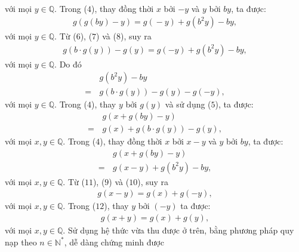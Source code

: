 \begin{multicols}{2}
\begin{align*}
	\end{align*}
	với mọi $y \in \mathbb{Q}$.
	\vskip 0.05cm
	Trong ($4$), thay đồng thời $x$ bởi $-y$  và $y$ bởi $by$, ta được:
	\begin{align*}
		g\left( {g\left( {by} \right) \!-\! y} \right) \!=\! g\left( { \!-\! y} \right) \!+\! g\left( {{b^2}y} \right) \!-\! by, \tag{$8$}
	\end{align*}
	với mọi $y \in \mathbb{Q}$.
	\vskip 0.05cm
	Từ ($6$), ($7$) và ($8$), suy ra
	\begin{align*}
		g\left( {b \cdot g\left( y \right)} \right) - g\left( y \right) = g\left( { - y} \right) + g\left( {{b^2}y} \right) - by,
	\end{align*}
	với mọi $y \in \mathbb{Q}$.
	\vskip 0.05cm
	Do đó
	\begin{align*}
		&g\left( {{b^2}y} \right) - by \\
		= \,&g\left( {b \cdot g\left( y \right)} \right) - g\left( y \right) - g\left( { - y} \right), \tag{$9$}
	\end{align*}
	với mọi $y \in \mathbb{Q}$.
	\vskip 0.05cm
	Trong ($4$), thay $y$ bởi $g(y)$ và sử dụng ($5$), ta được:
	\begin{align*}
		&g\left( {x + g\left( {by} \right) - y} \right) \\
		= \,&g\left( x \right) + g\left( {b \cdot g\left( y \right)} \right) - g\left( y \right), \tag{$10$}
	\end{align*}
	với mọi $x,y \in \mathbb{Q}$.
	\vskip 0.05cm
	Trong ($4$), thay đồng thời $x$ bởi $x-y$  và $y$ bởi $by$, ta được:
	\begin{align*}
		&g\left( {x + g\left( {by} \right) - y} \right) \\
		= \,&g\left( {x - y} \right) + g\left( {{b^2}y} \right) - by, \tag{$11$}
	\end{align*}
	với mọi $x,y \in \mathbb{Q}$.
	\vskip 0.05cm
	Từ ($11$), ($9$) và ($10$), suy ra
	\begin{align*}
		g\left( {x - y} \right) = g\left( x \right) + g\left( { - y} \right), \tag{$12$}
	\end{align*}
	với mọi $x,y \in \mathbb{Q}$.
	\vskip 0.05cm
	Trong ($12$), thay $y$ bởi $(-y)$  ta được:
	\begin{align*}
		g\left( {x + y} \right) = g\left( x \right) + g\left( y \right),
	\end{align*}
	với mọi $x,y \in \mathbb{Q}$.
	\vskip 0.05cm
	Sử dụng hệ thức vừa thu được ở trên, bằng phương pháp quy nạp theo $n \in \mathbb{N^*}$, dễ dàng chứng minh được
	\begin{align*}

\end{align*}
\end{multicols}
